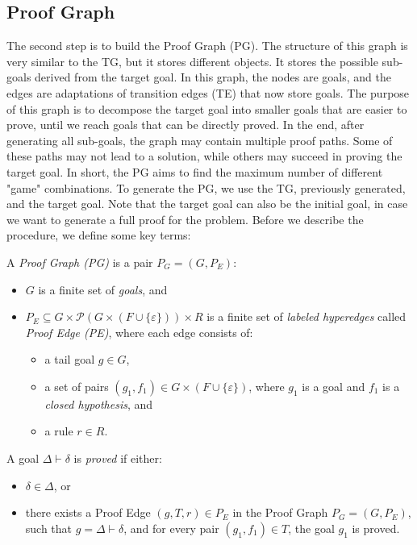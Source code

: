 \subsection{Proof Graph}
The second step is to build the Proof Graph (PG). The structure of this graph is very similar to the TG, but it stores different objects. It stores the possible sub-goals derived from the target goal. In this graph, the nodes are goals, and the edges are adaptations of transition edges (TE) that now store goals. The purpose of this graph is to decompose the target goal into smaller goals that are easier to prove, until we reach goals that can be directly proved. In the end, after generating all sub-goals, the graph may contain multiple proof paths. Some of these paths may not lead to a solution, while others may succeed in proving the target goal. In short, the PG aims to find the maximum number of different "game" combinations. To generate the PG, we use the TG, previously generated, and the target goal. Note that the target goal can also be the initial goal, in case we want to generate a full proof for the problem. Before we describe the procedure, we define some key terms:

\begin{definition}
A \emph{Proof Graph (PG)} is a pair $P_G = (G, P_E)$:
\begin{itemize}
  \item \( G \) is a finite set of \emph{goals}, and
  \item \( P_E \subseteq G \times \mathcal{P}(G \times (F \cup \{\varepsilon\})) \times R \) is a finite set of \emph{labeled hyperedges} called \emph{Proof Edge (PE)}, where each edge consists of:
  \begin{itemize}
    \item a tail goal \( g \in G \),
    \item a set of pairs \( (g_1, f_1) \in G \times (F \cup \{\varepsilon\}) \), where \( g_1 \) is a goal and \( f_1 \) is a \emph{closed hypothesis}, and
    \item a rule \( r \in R \).
  \end{itemize}
\end{itemize}
\end{definition}

\begin{definition}
A goal \( \Delta \vdash \delta \) is \emph{proved} if either:
\begin{itemize}
  \item \( \delta \in \Delta \), or
  \item there exists a Proof Edge \( (g, T, r) \in P_E \) in the Proof Graph \( P_G = (G, P_E) \), such that \( g = \Delta \vdash \delta \), and for every pair \( (g_1, f_1) \in T \), the goal \( g_1 \) is proved.
\end{itemize}
\end{definition}

